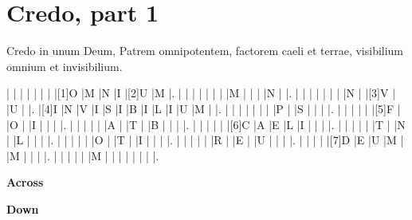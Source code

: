 \documentclass{article}
\begin{document}
\section{Credo, part 1}

Credo in unum Deum, Patrem omnipotentem, factorem caeli et terrae, visibilium omnium et invisibilium.

\begin{Puzzle}{13}{13}
|{} |{} |{} |{} |{} |{} |{} |[1]O |M |N |I |[2]U |M |.
|{} |{} |{} |{} |{} |{} |{} |M |{} |{} |{} |N |{} |.
|{} |{} |{} |{} |{} |{} |{} |N |{} |[3]V |{} |U |{} |.
|[4]I |N |V |I |S |I |B |I |L |I |U |M |{} |.
|{} |{} |{} |{} |{} |{} |{} |P |{} |S |{} |{} |{} |.
|{} |{} |{} |{} |{} |[5]F |{} |O |{} |I |{} |{} |{} |.
|{} |{} |{} |{} |{} |A |{} |T |{} |B |{} |{} |{} |.
|{} |{} |{} |{} |{} |[6]C |A |E |L |I |{} |{} |{} |.
|{} |{} |{} |{} |{} |T |{} |N |{} |L |{} |{} |{} |.
|{} |{} |{} |{} |{} |O |{} |T |{} |I |{} |{} |{} |.
|{} |{} |{} |{} |{} |R |{} |E |{} |U |{} |{} |{} |.
|{} |{} |{} |{} |[7]D |E |U |M |{} |M |{} |{} |{} |.
|{} |{} |{} |{} |{} |M |{} |{} |{} |{} |{} |{} |{} |.
\end{Puzzle}
\begin{PuzzleClues}{\textbf{Across}}
\end{PuzzleClues}

\begin{PuzzleClues}{\textbf{Down}}
\end{PuzzleClues}
\end{document}
